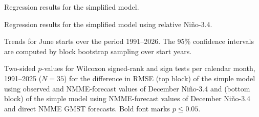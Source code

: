\documentclass[draft]{agujournal2019}
\begin{document}
\begin{table}
  
  
  \caption{Regression results for the simplified model.}
  \label{tab:model-sm}
\end{table}

\begin{table}
  
  
  \caption{Regression results for the simplified model using relative Ni\~no-3.4.}
  \label{tab:model-sm-roni}
\end{table}

\begin{table}
  
  
  \caption{Trends for June starts over the period
      1991--2026. The 95\% confidence intervals are computed by block
      bootstrap sampling over start years.}
  \label{tab:trends}
\end{table}

\begin{table}
  
  \caption{Two-sided $p$-values for Wilcoxon signed-rank and sign
    tests per calendar month, 1991--2025 (${N = 35}$) for the
    difference in RMSE (top block) of the simple model using observed
    and NMME-forecast values of December Ni\~no-3.4 and (bottom block)
    of the simple model using NMME-forecast values of December
    Ni\~no-3.4 and direct NMME GMST forecasts. Bold font marks
    ${p \leq 0.05}$.}
  \label{tab:rmse-sig}
\end{table}

\end{document}
